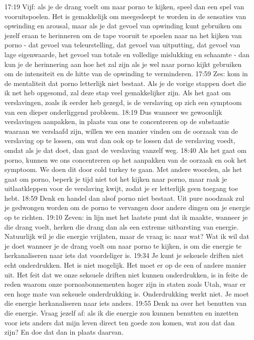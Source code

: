 17:19
Vijf: als je de drang voelt om naar porno te kijken, speel dan een spel van vooruitspoelen. Het is gemakkelijk om meegesleept te worden in de sensaties van opwinding en arousal, maar als je dat gevoel van opwinding kunt gebruiken om jezelf eraan te herinneren om de tape vooruit te spoelen naar na het kijken van porno - dat gevoel van teleurstelling, dat gevoel van uitputting, dat gevoel van lage eigenwaarde, het gevoel van totale en volledige mislukking en schaamte - dan kun je de herinnering aan hoe het zal zijn als je wel naar porno kijkt gebruiken om de intensiteit en de hitte van de opwinding te verminderen.
17:59
Zes: kom in de mentaliteit dat porno letterlijk niet bestaat. Als je de vorige stappen doet die ik net heb opgesomd, zal deze stap veel gemakkelijker zijn. Als het gaat om verslavingen, zoals ik eerder heb gezegd, is de verslaving op zich een symptoom van een dieper onderliggend probleem.
18:19
Dus wanneer we gewoonlijk verslavingen aanpakken, in plaats van ons te concentreren op de substantie waaraan we verslaafd zijn, willen we een manier vinden om de oorzaak van de verslaving op te lossen, om wat dan ook op te lossen dat de verslaving voedt, omdat als je dat doet, dan gaat de verslaving vanzelf weg.
18:40
Als het gaat om porno, kunnen we ons concentreren op het aanpakken van de oorzaak en ook het symptoom. We doen dit door cold turkey te gaan. Met andere woorden, als het gaat om porno, beperk je tijd niet tot het kijken naar porno, maar raak je uitlaatkleppen voor de verslaving kwijt, zodat je er letterlijk geen toegang toe hebt.
18:59
Denk en handel dan alsof porno niet bestaat. Uit pure noodzaak zul je gedwongen worden om de porno te vervangen door andere dingen om je energie op te richten.
19:10
Zeven: in lijn met het laatste punt dat ik maakte, wanneer je die drang voelt, herken die drang dan als een extreme uitbarsting van energie. Natuurlijk wil je die energie vrijlaten, maar de vraag is: naar wat? Wat ik wil dat je doet wanneer je de drang voelt om naar porno te kijken, is om die energie te herkanaliseren naar iets dat voordeliger is.
19:34
Je kunt je seksuele driften niet echt onderdrukken. Het is niet mogelijk. Het moet er op de een of andere manier uit. Het feit dat we onze seksuele driften niet kunnen onderdrukken, is in feite de reden waarom onze pornoabonnementen hoger zijn in staten zoals Utah, waar er een hoge mate van seksuele onderdrukking is. Onderdrukking werkt niet. Je moet die energie herkanaliseren naar iets anders.
19:55
Denk na over het benutten van die energie. Vraag jezelf af: als ik die energie zou kunnen benutten en inzetten voor iets anders dat mijn leven direct ten goede zou komen, wat zou dat dan zijn? En doe dat dan in plaats daarvan.
